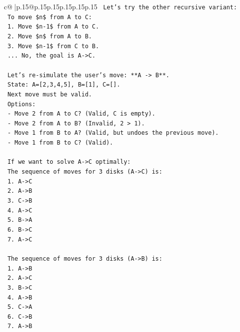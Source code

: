 \documentclass{article}
\begin{document}
{\begin{supertabular}{c@{$\;$}|p{.15\linewidth}@{}p{.15\linewidth}p{.15\linewidth}p{.15\linewidth}p{.15\linewidth}p{.15\linewidth}}
{{{\texttt{    Let's try the other recursive variant:} \\
\texttt{    To move \$n\$ from A to C:} \\
\texttt{    1. Move \$n{-}1\$ from A to C.} \\
\texttt{    2. Move \$n\$ from A to B.} \\
\texttt{    3. Move \$n{-}1\$ from C to B.} \\
\texttt{    ... No, the goal is A{-}>C.} \\
\\ 
\texttt{    Let's re{-}simulate the user's move: **A {-}> B**.} \\
\texttt{    State: A={[}2,3,4,5{]}, B={[}1{]}, C={[}{]}.} \\
\texttt{    Next move must be valid.} \\
\texttt{    Options:} \\
\texttt{    {-} Move 2 from A to C? (Valid, C is empty).} \\
\texttt{    {-} Move 2 from A to B? (Invalid, 2 > 1).} \\
\texttt{    {-} Move 1 from B to A? (Valid, but undoes the previous move).} \\
\texttt{    {-} Move 1 from B to C? (Valid).} \\
\\ 
\texttt{    If we want to solve A{-}>C optimally:} \\
\texttt{    The sequence of moves for 3 disks (A{-}>C) is:} \\
\texttt{    1. A{-}>C} \\
\texttt{    2. A{-}>B} \\
\texttt{    3. C{-}>B} \\
\texttt{    4. A{-}>C} \\
\texttt{    5. B{-}>A} \\
\texttt{    6. B{-}>C} \\
\texttt{    7. A{-}>C} \\
\\ 
\texttt{    The sequence of moves for 3 disks (A{-}>B) is:} \\
\texttt{    1. A{-}>B} \\
\texttt{    2. A{-}>C} \\
\texttt{    3. B{-}>C} \\
\texttt{    4. A{-}>B} \\
\texttt{    5. C{-}>A} \\
\texttt{    6. C{-}>B} \\
\texttt{    7. A{-}>B} \\
}}}
\end{supertabular}}
\end{document}
